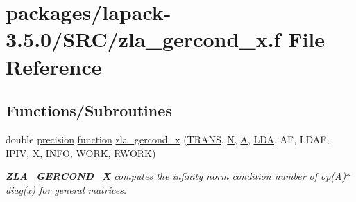 \hypertarget{zla__gercond__x_8f}{}\section{packages/lapack-\/3.5.0/\+S\+R\+C/zla\+\_\+gercond\+\_\+x.f File Reference}
\label{zla__gercond__x_8f}
\subsection*{Functions/\+Subroutines}
\begin{DoxyCompactItemize}
\item 
double \hyperlink{numinquire_8h_a2c8e616467665d0b2814d4c1589ba74e}{precision} \hyperlink{afunc_8m_a7b5e596df91eadea6c537c0825e894a7}{function} \hyperlink{group__complex16GEcomputational_gae625c625f36963209b3b3ddd640b6305}{zla\+\_\+gercond\+\_\+x} (\hyperlink{superlu__enum__consts_8h_a0c4e17b2d5cea33f9991ccc6a6678d62a1f61e3015bfe0f0c2c3fda4c5a0cdf58}{T\+R\+A\+N\+S}, \hyperlink{polmisc_8c_a0240ac851181b84ac374872dc5434ee4}{N}, \hyperlink{classA}{A}, \hyperlink{example__user_8c_ae946da542ce0db94dced19b2ecefd1aa}{L\+D\+A}, A\+F, L\+D\+A\+F, I\+P\+I\+V, X, I\+N\+F\+O, W\+O\+R\+K, R\+W\+O\+R\+K)
\begin{DoxyCompactList}\small\item\em {\bfseries Z\+L\+A\+\_\+\+G\+E\+R\+C\+O\+N\+D\+\_\+\+X} computes the infinity norm condition number of op(\+A)$\ast$diag(x) for general matrices. \end{DoxyCompactList}\end{DoxyCompactItemize}
